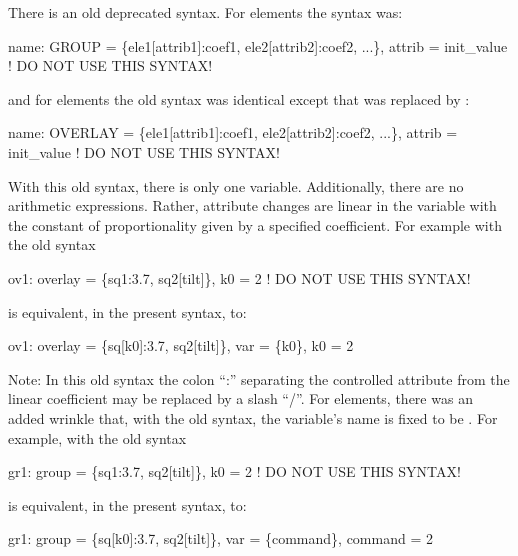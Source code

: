 There is an old deprecated syntax. For  elements the syntax was:
\begin{example}
  name: GROUP = \{ele1[attrib1]:coef1, ele2[attrib2]:coef2, ...\}, 
                       attrib = init_value  ! DO NOT USE THIS SYNTAX!
\end{example}
and for  elements the old syntax was identical except
that  was replaced by :
\begin{example}
  name: OVERLAY = \{ele1[attrib1]:coef1, ele2[attrib2]:coef2, ...\}, 
                       attrib = init_value  ! DO NOT USE THIS SYNTAX!
\end{example}

With this old syntax, there is only one variable. Additionally, there
are no arithmetic expressions. Rather, attribute changes are linear in
the  variable with the constant of proportionality given
by a specified coefficient. For example with the old syntax
\begin{example}
  ov1: overlay = \{sq1:3.7, sq2[tilt]\}, k0 = 2  ! DO NOT USE THIS SYNTAX!
\end{example}
is equivalent, in the present syntax, to:
\begin{example}
  ov1: overlay = \{sq[k0]:3.7, sq2[tilt]\}, var = \{k0\}, k0 = 2  
\end{example}
Note: In this old syntax the colon ``:'' separating the controlled
attribute from the linear coefficient may be replaced by a slash
``/''.  For  elements, there was an added wrinkle that, with
the old syntax, the variable's name is fixed to be . For
example, with the old syntax
\begin{example}
  gr1: group = \{sq1:3.7, sq2[tilt]\}, k0 = 2  ! DO NOT USE THIS SYNTAX!
\end{example}
is equivalent, in the present syntax, to:
\begin{example}
  gr1: group = \{sq[k0]:3.7, sq2[tilt]\}, var = \{command\}, command = 2  
\end{example}

